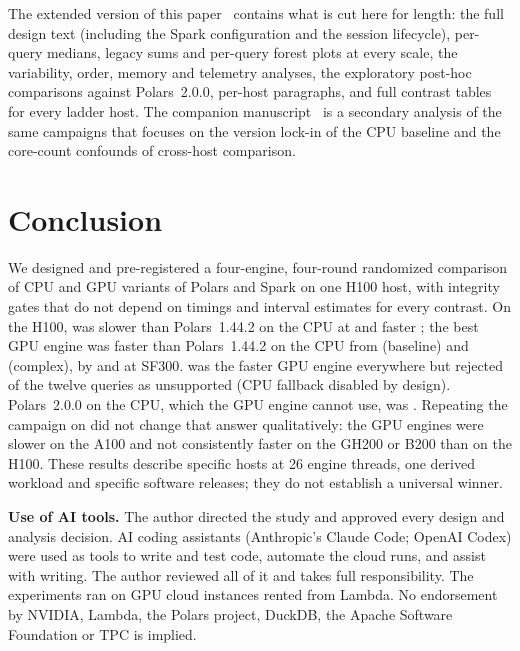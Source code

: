 \documentclass[sigconf, nonacm]{acmart}
\begin{document}
The extended version of this paper~\citep{ejiofor2026extended} contains what
is cut here for length: the full design text (including the Spark
configuration and the session lifecycle), per-query medians, legacy sums and
per-query forest plots at every scale, the variability, order, memory and
telemetry analyses, the exploratory post-hoc comparisons against Polars~2.0.0,
per-host paragraphs, and full contrast tables for every ladder host. The
companion manuscript~\citep{ejiofor2026lockin} is a secondary analysis of the
same campaigns that focuses on the version lock-in of the CPU baseline and the
core-count confounds of cross-host comparison.

\section{Conclusion}
\label{sec:conclusion}

We designed and pre-registered a four-engine, four-round randomized comparison
of CPU and GPU variants of Polars and Spark on one H100 host, with integrity
gates that do not depend on timings and interval estimates for every contrast.
On the H100, \polarsgpu{} was slower than Polars~1.44.2 on the CPU at
 and faster ; the best
GPU engine was faster than Polars~1.44.2 on the CPU from
 (baseline) and
 (complex), by 
and  at SF300. \polarsgpu{} was the faster GPU
engine everywhere but rejected 
of the twelve queries as unsupported (CPU fallback disabled by design).
Polars~2.0.0 on the CPU, which the GPU engine cannot use, was
.
\ifladderran
Repeating the campaign on  did not change that
answer qualitatively: the GPU engines were slower on the A100 and not
consistently faster on the GH200 or B200 than on the H100.
\fi
These results describe specific hosts at 26 engine threads, one derived
workload and specific software releases; they do not establish a universal
winner.

\begin{acks}
\textbf{Use of AI tools.} The author directed the study and approved every design
and analysis decision. AI coding assistants (Anthropic's Claude Code; OpenAI
Codex) were used as tools to write and test code, automate the cloud runs,
and assist with writing. The author reviewed all of it and takes full
responsibility.
The experiments ran on GPU cloud instances rented from Lambda. No endorsement
by NVIDIA, Lambda, the Polars project, DuckDB, the Apache Software Foundation
or TPC is implied.
\end{acks}



\end{document}
